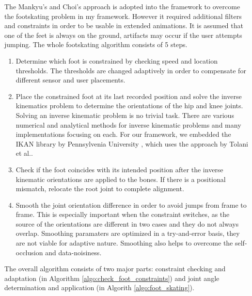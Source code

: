 The Mankyu's and Choi's approach is adopted into the framework to overcome the footskating problem in my framework. However it required additional filters and constraints in order to be usable in extended 
animations. It is assumed that one of the feet is always on the ground, artifacts may occur if the user attempts jumping. The whole footskating algorithm consists of 5 steps. 

\begin{enumerate}
\item Determine which foot is constrained by checking speed and location thresholds. The thresholds are changed adaptively in order to compensate for different sensor and user placements.
\item Place the constrained foot at its last recorded position and solve the inverse kinematics problem to determine the orientations of the hip and knee joints. Solving an inverse kinematic
problem is no trivial task. There are various numerical and analytical methods for inverse kinematic problems and many implementations focusing on each. For our framework, we embedded 
the IKAN library by Pennsylvenia University \cite{IKAN2013}, which uses the approach by Tolani et al.\cite{Tolani2000}.  
\item Check if the foot coincides with its intended position after the inverse kinematic orientations are applied to the bones. If there is a positional mismatch, relocate the root joint to complete alignment.
\item Smooth the joint orientation difference in order to avoid jumps from frame to frame. This is especially important when the constraint switches, as the source of the orientations are different in two cases and they do not always overlap.
Smoothing paramaters are optimized in a try-and-error basis, they are not viable for adaptive nature. Smoothing also helps to overcome the self-occlusion and data-noisiness.
\end{enumerate}

The overall algorithm consists of two major parts: constraint checking and adaptation (in Algorithm \ref{algo:check_foot_constraints}) and joint angle determination and application (in Algorith \ref{algo:foot_skating}).  

